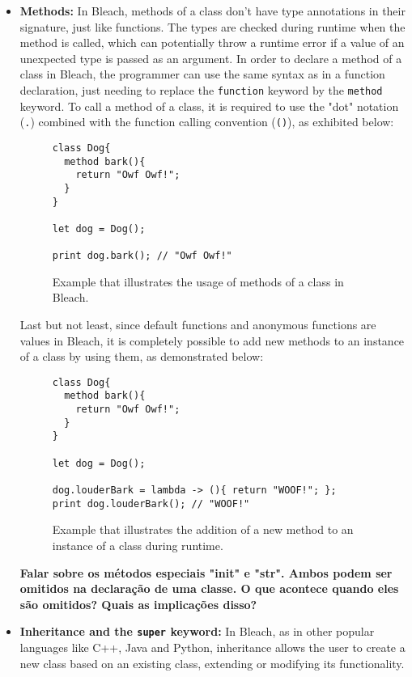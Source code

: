 \begin{itemize}
    \item \textbf{Methods:} In Bleach, methods of a class don't have type annotations in their signature, just like functions. The types are checked during runtime when the method is called, which can potentially throw a runtime error if a value of an unexpected type is passed as an argument. In order to declare a method of a class in Bleach, the programmer can use the same syntax as in a function declaration, just needing to replace the \texttt{function} keyword by the \texttt{method} keyword. To call a method of a class, it is required to use the "dot" notation (\texttt{.}) combined with the function calling convention (\texttt{()}), as exhibited below:
\begin{figure}[H]
    \centering
    \begin{lstlisting}
class Dog{
  method bark(){
    return "Owf Owf!";
  }
}

let dog = Dog();

print dog.bark(); // "Owf Owf!"
    \end{lstlisting}
    \caption{Example that illustrates the usage of methods of a class in Bleach.}
\end{figure}

    Last but not least, since default functions and anonymous functions are values in Bleach, it is completely possible to add new methods to an instance of a class by using them, as demonstrated below:
\begin{figure}[H]
    \centering
    \begin{lstlisting}
class Dog{
  method bark(){
    return "Owf Owf!";
  }
}

let dog = Dog();

dog.louderBark = lambda -> (){ return "WOOF!"; };
print dog.louderBark(); // "WOOF!"
    \end{lstlisting}
    \caption{Example that illustrates the addition of a new method to an instance of a class during runtime.}
\end{figure}
    
    \textbf{Falar sobre os métodos especiais "init" e "str". Ambos podem ser omitidos na declaração de uma classe. O que acontece quando eles são omitidos? Quais as implicações disso?}

    
    \item \textbf{Inheritance and the \texttt{super} keyword:} In Bleach, as in other popular languages like C++, Java and Python, inheritance allows the user to create a new class based on an existing class, extending or modifying its functionality.


\end{itemize}
